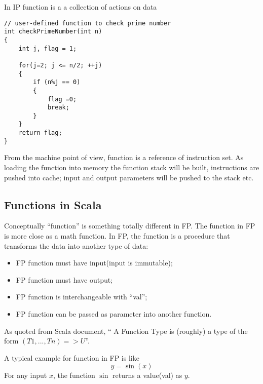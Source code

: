 \documentclass[notheorems, aspectratio=54]{beamer}
\begin{document}
\begin{frame}[fragile]
  
\begin{block}{In IP function is a a collection of actions on data}
\begin{verbatim}
// user-defined function to check prime number
int checkPrimeNumber(int n)
{
    int j, flag = 1;

    for(j=2; j <= n/2; ++j)
    {
        if (n%j == 0)
        {
            flag =0;
            break;
        }
    }
    return flag;
}   
\end{verbatim}   
\end{block}
From the machine point of view, function is a reference of instruction set. As
loading the function into memory the function stack will be built, instructions are pushed into cache; 
input and output parameters will be pushed to the stack etc.
  
\end{frame}

\subsection{Functions in Scala}
\begin{frame}

Conceptually ``function'' is something totally different in FP. The function in FP is more close as a math function. 
In FP, the function is a procedure that transforms the data into another type of data:
\begin{itemize}
 \item FP function must have input(input is immutable);
 \item FP function must have output;
 \item FP function is interchangeable with ``val'';
 \item FP function can be passed as parameter into another function.
\end{itemize}
As quoted from Scala document, `` A Function Type is (roughly) a type of the form $(T1, ..., Tn) => U$''. 

A typical example for function in FP is like 
\begin{equation}
 y = \sin (x) 
\end{equation}
For any input $x$, the function $\sin$ returns a value(val) as $y$. 


\end{frame}
\end{document}
